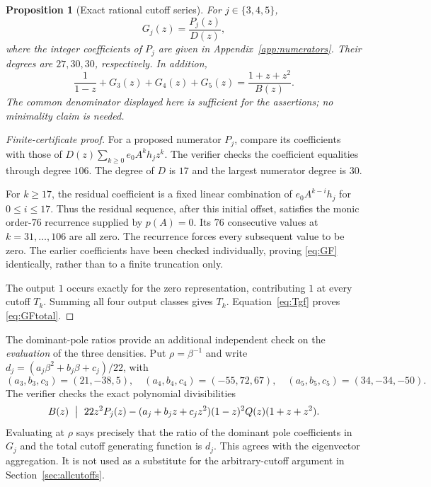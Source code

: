 \documentclass[11pt,a4paper]{article}
\newtheorem{proposition}[theorem]{Proposition}
\theoremstyle{definition}
\theoremstyle{remark}
\begin{document}
\begin{proposition}[Exact rational cutoff series]\label{prop:GF}
For $j\in\{3,4,5\}$,
\begin{equation}\label{eq:GF}
 G_j(z)=\frac{P_j(z)}{D(z)},
\end{equation}
where the integer coefficients of $P_j$ are given in
Appendix~\ref{app:numerators}. Their degrees are $27,30,30$, respectively.
In addition,
\begin{equation}\label{eq:GFtotal}
 \frac1{1-z}+G_3(z)+G_4(z)+G_5(z)
   =\frac{1+z+z^2}{B(z)}.
\end{equation}
The common denominator displayed here is sufficient for the assertions;
no minimality claim is needed.
\end{proposition}
\begin{proof}[Finite-certificate proof]
For a proposed numerator $P_j$, compare its coefficients with those of
$D(z)\sum_{k\ge0}e_0A^kh_jz^k$. The verifier checks the coefficient
equalities through degree $106$. The degree of $D$ is $17$ and the largest
numerator degree is $30$.

For $k\ge17$, the residual coefficient is a fixed linear combination of
$e_0A^{k-i}h_j$ for $0\le i\le17$. Thus the residual sequence, after this
initial offset, satisfies the monic order-$76$ recurrence supplied by
$p(A)=0$. Its $76$ consecutive values at $k=31,\ldots,106$ are all zero.
The recurrence forces every subsequent value to be zero. The earlier
coefficients have been checked individually, proving \eqref{eq:GF}
identically, rather than to a finite truncation only.

The output $1$ occurs exactly for the zero representation, contributing
$1$ at every cutoff $T_k$. Summing all four output classes gives $T_k$.
Equation~\eqref{eq:Tgf} proves \eqref{eq:GFtotal}.
\end{proof}

The dominant-pole ratios provide an additional independent check on the
\emph{evaluation} of the three densities. Put $\rho=\beta^{-1}$ and
write $d_j=(a_j\beta^2+b_j\beta+c_j)/22$, with
\[
 (a_3,b_3,c_3)=(21,-38,5),\quad
 (a_4,b_4,c_4)=(-55,72,67),\quad
 (a_5,b_5,c_5)=(34,-34,-50).
\]
The verifier checks the exact polynomial divisibilities
\begin{equation}\label{eq:residuecert}
 B(z)\ \bigm|\ 22z^2P_j(z)
 -(a_j+b_jz+c_jz^2)(1-z)^2Q(z)(1+z+z^2).
\end{equation}
Evaluating at $\rho$ says precisely that the ratio of the dominant pole
coefficients in $G_j$ and the total cutoff generating function is $d_j$.
This agrees with the eigenvector aggregation. It is not used as a substitute
for the arbitrary-cutoff argument in Section~\ref{sec:allcutoffs}.
\end{document}
